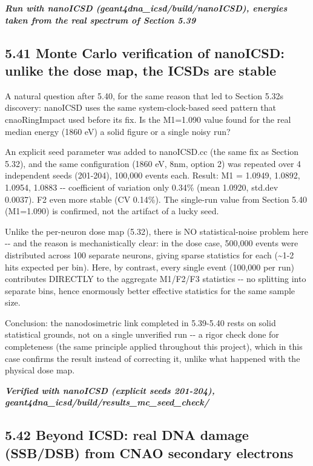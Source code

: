 \documentclass[
  english,
]{article}
\begin{document}
\emph{\textbf{Run with nanoICSD (geant4dna\_\allowbreak{}icsd/build/nanoICSD), energies taken from the real spectrum of Section 5.39}}

\subsection{5.41 Monte Carlo verification of nanoICSD: unlike the dose map, the ICSDs are stable}\label{monte-carlo-verification-of-nanoicsd-unlike-the-dose-map-the-icsds-are-stable}

A natural question after 5.40, for the same reason that led to Section 5.32\textquotesingle s discovery: nanoICSD uses the same system-clock-based seed pattern that cnaoRingImpact used before its fix. Is the M1=1.090 value found for the real median energy (1860 eV) a solid figure or a single noisy run?

An explicit seed parameter was added to nanoICSD.cc (the same fix as Section 5.32), and the same configuration (1860 eV, 8nm, option 2) was repeated over 4 independent seeds (201-204), 100,000 events each. Result: M1 = 1.0949, 1.0892, 1.0954, 1.0883 -\/- coefficient of variation only 0.34\% (mean 1.0920, std.dev 0.0037). F2 even more stable (CV 0.14\%). The single-run value from Section 5.40 (M1=1.090) is confirmed, not the artifact of a lucky seed.

Unlike the per-neuron dose map (5.32), there is NO statistical-noise problem here -\/- and the reason is mechanistically clear: in the dose case, 500,000 events were distributed across 100 separate neurons, giving sparse statistics for each (\textasciitilde1-2 hits expected per bin). Here, by contrast, every single event (100,000 per run) contributes DIRECTLY to the aggregate M1/F2/F3 statistics -\/- no splitting into separate bins, hence enormously better effective statistics for the same sample size.

Conclusion: the nanodosimetric link completed in 5.39-5.40 rests on solid statistical grounds, not on a single unverified run -\/- a rigor check done for completeness (the same principle applied throughout this project), which in this case confirms the result instead of correcting it, unlike what happened with the physical dose map.

\emph{\textbf{Verified with nanoICSD (explicit seeds 201-204), geant4dna\_\allowbreak{}icsd/build/results\_\allowbreak{}mc\_\allowbreak{}seed\_\allowbreak{}check/}}

\subsection{5.42 Beyond ICSD: real DNA damage (SSB/DSB) from CNAO secondary electrons}\label{beyond-icsd-real-dna-damage-ssbdsb-from-cnao-secondary-electrons}
\end{document}
